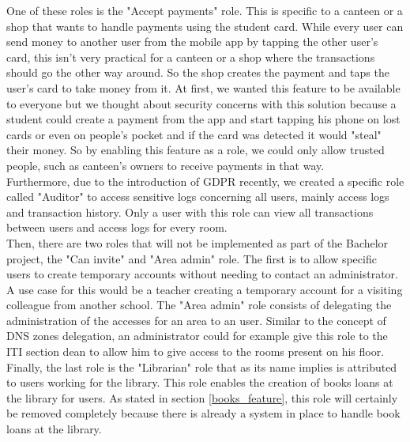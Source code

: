 \documentclass[11pt,a4paper]{report}
\begin{document}
One of these roles is the "Accept payments" role. This is specific to a canteen or a shop that wants to handle payments using the student card. While every user can send money to another user from the mobile app by tapping the other user's card, this isn't very practical for a canteen or a shop where the transactions should go the other way around. So the shop creates the payment and taps the user's card to take money from it. At first, we wanted this feature to be available to everyone but we thought about security concerns with this solution because a student could create a payment from the app and start tapping his phone on lost cards or even on people's pocket and if the card was detected it would "steal" their money. So by enabling this feature as a role, we could only allow trusted people, such as canteen's owners to receive payments in that way. \\

Furthermore, due to the introduction of GDPR recently, we created a specific role called "Auditor" to access sensitive logs concerning all users, mainly access logs and transaction history. Only a user with this role can view all transactions between users and access logs for every room.\\

Then, there are two roles that will not be implemented as part of the Bachelor project, the "Can invite" and "Area admin" role. The first is to allow specific users to create temporary accounts without needing to contact an administrator. A use case for this would be a teacher creating a temporary account for a visiting colleague from another school. The "Area admin" role consists of delegating the administration of the accesses for an area to an user. Similar to the concept of DNS zones delegation, an administrator could for example give this role to the ITI section dean to allow him to give access to the rooms present on his floor.\\

Finally, the last role is the "Librarian" role that as its name implies is attributed to users working for the library. This role enables the creation of books loans at the library for users. As stated in section \ref{books_feature}, this role will certainly be removed completely because there is already a system in place to handle book loans at the library.
\end{document}
